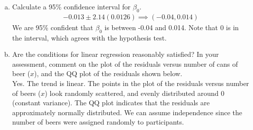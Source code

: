 \documentclass[11pt]{article}\usepackage[]{graphicx}\usepackage[]{color}
\begin{document}
\begin{enumerate}[(a)]
\item Calculate a 95\% confidence interval for $\beta_0$.
\begin{align*}
-0.013 \pm 2.14(0.0126) \implies (-0.04, 0.014) 
\end{align*}
We are 95\% confident that $\beta_0$ is between -0.04 and 0.014.  Note that 0 is in the interval, which agrees with the hypothesis test.\\

\item Are the conditions for linear regression reasonably satisfied?  In your assessment, comment on the plot of the residuals versus number of cans of beer ($x$), and the QQ plot of the residuals shown below.\\
Yes.  The trend is linear.  The points in the plot of the residuals versus number of beers ($x$) look randomly scattered, and evenly distributed around 0 (constant variance).  The QQ plot indicates that the residuals are approximately normally distributed.  We can assume independence since the number of beers were assigned randomly to participants.  

\end{enumerate}
\end{document}
